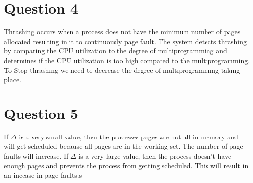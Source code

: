 \documentclass[11pt]{article}
\begin{document}
\section*{Question 4}
Thrashing occurs when a process does not have the minimum number 
of pages allocated resulting in it to continuously page fault. The 
system detects thrashing by  comparing the CPU utilization to 
the degree of multiprogramming and determines if the CPU 
utilization is too high compared to the multiprogramming. To 
Stop thrashing we need to decrease the degree of multiprogramming
taking place.
\section*{Question 5}
If $\Delta$ is a very small value, then the processes pages are 
not all in memory and will get scheduled because all pages are 
in the working set. The number of page faults will increase. If 
$\Delta$ is a very large value, then the process doesn't have enough pages
and prevents the process from getting scheduled. This will result 
in an incease in page faults.s
\end{document}
